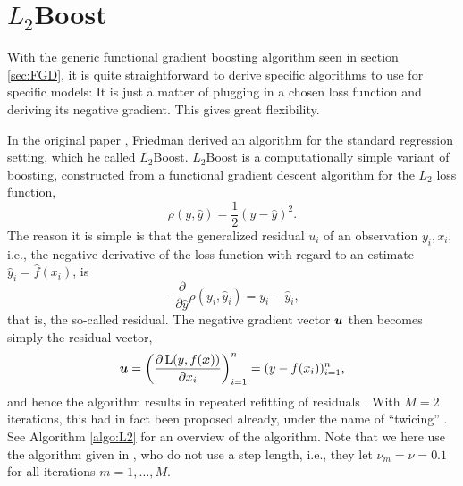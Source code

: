 
\section{$L_2$Boost}
With the generic functional gradient boosting algorithm seen in section \ref{sec:FGD}, it is quite straightforward to derive specific algorithms to use for specific models:
It is just a matter of plugging in a chosen loss function and deriving its negative gradient.
This gives great flexibility.

In the original paper \citep{friedman2001}, Friedman derived an algorithm for the standard regression setting, which he called $L_2$Boost.
$L_2$Boost is a computationally simple variant of boosting, constructed from a functional gradient descent algorithm for the $L_2$ loss function,
\begin{equation*}
    \rho(y, \hat{y})=\frac{1}{2}(y-\hat{y})^2.
\end{equation*}
The reason it is simple is that the generalized residual $u_i$ of an observation $y_i,x_i$, i.e., the negative derivative of the loss function with regard to an estimate $\hat{y}_i=\hat{f}(x_i)$, is
\begin{equation*}
    -\frac{\partial}{\partial\hat{y}}\rho(y_i, \hat{y}_i)=y_i-\hat{y}_i,
\end{equation*}
that is, the so-called residual. The negative gradient vector $\bm{u}$ then becomes simply the residual vector,
\begin{equation*}
    \bm{u}=\left(\frac{\partial\operatorname{L}(y,f(\bm{x}))}{\partial x_i}\right)_{i=1}^n=(y-f(x_i))_{i=1}^n,
\end{equation*}
and hence the algorithm results in repeated refitting of residuals \citep{friedman2001,buhlmann-yu}.
With $M=2$ iterations, this had in fact been proposed already, under the name of ``twicing'' \citep{tukey}.
See Algorithm \ref{algo:L2} for an overview of the algorithm. Note that we here use the algorithm given in \citet{buhlmann-yu}, who do not use a step length, i.e., they let $\nu_m=\nu=0.1$ for all iterations $m=1,\ldots,M$.
